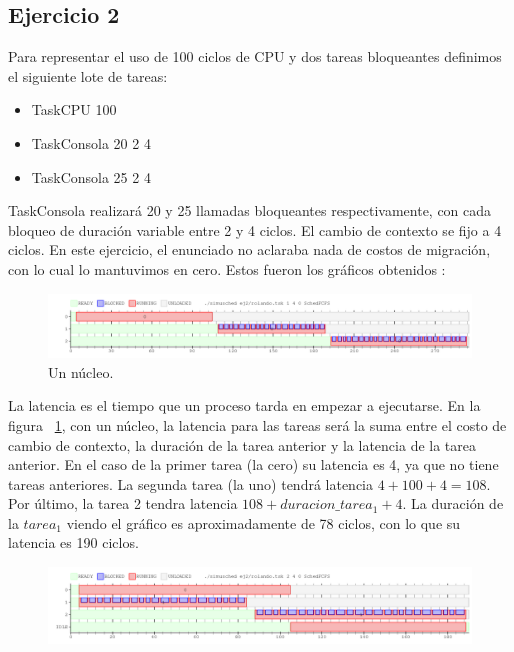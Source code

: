 \subsection{Ejercicio 2}

Para representar el uso de 100 ciclos de CPU y dos tareas bloqueantes definimos el siguiente lote de tareas:\\

\begin{itemize}
\item TaskCPU 100 
\item TaskConsola 20 2 4
\item TaskConsola 25 2 4
\end{itemize}
TaskConsola realizará 20 y 25 llamadas bloqueantes respectivamente, con cada bloqueo de duración variable entre 2 y 4 ciclos. El cambio de contexto se fijo a 4 ciclos. En este ejercicio, el enunciado no aclaraba nada de costos de migración, con lo cual lo mantuvimos en cero. Estos fueron los gráficos obtenidos :



\begin{figure}[h]
  \includegraphics[width=\textwidth]{../ej2/uncore.png}
  \caption{Un núcleo.}
  \label{fig:unnucleo}
\end{figure}

La latencia es el tiempo que un proceso tarda en empezar a ejecutarse. En la figura ~\ref{fig:unnucleo}, con un núcleo, la latencia para las tareas será la suma entre el costo de cambio de contexto, la duración de la tarea anterior y la latencia de la tarea anterior. En el caso de la primer tarea (la cero) su latencia es 4, ya que no tiene tareas anteriores. La segunda tarea (la uno) tendrá latencia $ 4 + 100 + 4 = 108$. Por último, la tarea 2 tendra latencia $ 108 + duracion\_tarea_{1} + 4$. La duración de la $tarea_{1}$ viendo el gráfico es aproximadamente de 78 ciclos, con lo que su latencia es 190 ciclos.




\begin{figure}[h]
  \includegraphics[width=\textwidth]{../ej2/doscores.png}
  \caption{}
  \label{fig:dosnucleos}
\end{figure}

